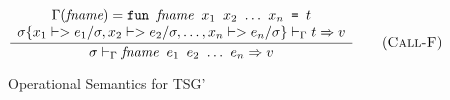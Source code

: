 \documentclass[10pt]{../sigplanconf}
\newcommand{\nfrac}[2]{\frac{\displaystyle{#1}}{\displaystyle{#2}}}
\newcommand{\tagsc}[1]{\tag{\scshape #1}}
\begin{document}
\begin{figure}
\begin{equation}
  \nfrac{
    \begin{array}{c}
      \Gamma(\textit{fname}) =
        \texttt{fun \textit{\rmfamily fname} $x_1$ $x_2$ $\ldots$ $x_n$ = $t$}
        \\
      \sigma\{x_1 |-> e_1/\sigma, x_2 |-> e_2/\sigma, \ldots, x_n |-> e_n/\sigma\} |-_\Gamma t => v
    \end{array}
  }{
    \sigma |-_\Gamma \texttt{\textit{\rmfamily fname} $e_1$ $e_2$ $\ldots$ $e_n$} => v
  } \tagsc{Call-F}
\end{equation}


\caption{Operational Semantics for TSG'}
\label{fig:semantics}
\end{figure}
\end{document}

